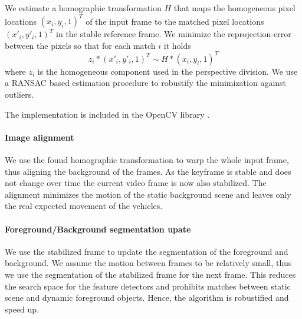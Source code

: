 We estimate a homographic transformation $H$ that maps the homogeneous pixel locations $(x_i, y_i, 1)^T$ of the input frame to the matched pixel locations $(x'_i, y'_i, 1)^T$ in the stable reference frame.
We minimize the reprojection-error between the pixels so that for each match $i$ it holds
\begin{equation}
 z_i  * (x'_i, y'_i, 1)^T \sim H * (x_i, y_i, 1)^T
 \label{eq:homographic_transformation}
\end{equation}
where $z_i$ is the homogeneous component used in the perspective division. 
We use a RANSAC \cite{fischler1981random} based estimation procedure to robustify the minimization against outliers.

The implementation is included in the OpenCV library \cite{opencv_library}.


\paragraph{Image alignment}
We use the found homographic transformation to warp the whole input frame, thus aligning the background of the frames.
As the keyframe is stable and does not change over time the current video frame is now also stabilized.
The alignment minimizes the motion of the static background scene and leaves only the real expected movement of the vehicles.


\paragraph{Foreground/Background segmentation upate}
We use the stabilized frame to update the segmentation of the foreground and background.
We assume the motion between frames to be relatively small, thus we use the segmentation of the stabilized frame for the next frame.
This reduces the search space for the feature detectors and prohibits matches between static scene and dynamic foreground objects. 
Hence, the algorithm is robustified and speed up.
